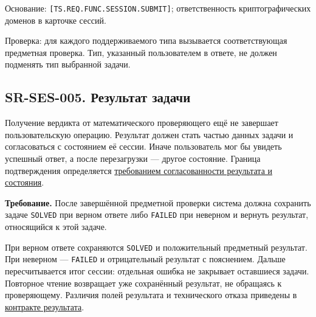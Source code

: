 \documentclass[12pt,a4paper]{article}
\begin{document}
Основание: \texttt{[TS.\allowbreak{}REQ.\allowbreak{}FUNC.\allowbreak{}SESSION.\allowbreak{}SUBMIT]}; ответственность криптографических доменов в карточке сессий.

Проверка: для каждого поддерживаемого типа вызывается соответствующая предметная проверка. Тип, указанный пользователем в ответе, не должен подменять тип выбранной задачи.

\subsection{SR-SES-005. Результат задачи}\label{sr-ses-005-ux440ux435ux437ux443ux43bux44cux442ux430ux442-ux437ux430ux434ux430ux447ux438}

\hypertarget{sr-ses-005-результат-задачи}{}

Получение вердикта от математического проверяющего ещё не завершает пользовательскую операцию. Результат должен стать частью данных задачи и согласоваться с состоянием её сессии. Иначе пользователь мог бы увидеть успешный ответ, а после перезагрузки --- другое состояние. Граница подтверждения определяется \hyperref[sr-sys-005-ux441ux43eux433ux43bux430ux441ux43eux432ux430ux43dux43dux43eux441ux442ux44c-ux440ux435ux437ux443ux43bux44cux442ux430ux442ux430-ux438-ux441ux43eux441ux442ux43eux44fux43dux438ux44f]{требованием согласованности результата и состояния}.

\textbf{Требование.} После завершённой предметной проверки система должна сохранить задаче \texttt{SOLVED} при верном ответе либо \texttt{FAILED} при неверном и вернуть результат, относящийся к этой задаче.

При верном ответе сохраняются \texttt{SOLVED} и положительный предметный результат. При неверном --- \texttt{FAILED} и отрицательный результат с пояснением. Дальше пересчитывается итог сессии: отдельная ошибка не закрывает оставшиеся задачи. Повторное чтение возвращает уже сохранённый результат, не обращаясь к проверяющему. Различия полей результата и технического отказа приведены в \href{../07_\%D0\%9F\%D1\%80\%D0\%BE\%D0\%B3\%D1\%80\%D0\%B0\%D0\%BC\%D0\%BC\%D0\%BD\%D1\%8B\%D0\%B5_\%D1\%82\%D1\%80\%D0\%B5\%D0\%B1\%D0\%BE\%D0\%B2\%D0\%B0\%D0\%BD\%D0\%B8\%D1\%8F/DOC-06.2_\%D0\%A1\%D0\%B5\%D1\%81\%D1\%81\%D0\%B8\%D0\%B8_\%D0\%B7\%D0\%B0\%D0\%B4\%D0\%B0\%D1\%87_\%D0\%B8_\%D0\%BF\%D0\%BB\%D0\%B0\%D0\%BD\%D0\%B8\%D1\%80\%D0\%BE\%D0\%B2\%D1\%89\%D0\%B8\%D0\%BA.pdf\#nameddest=\%D1\%80\%D0\%B5\%D0\%B7\%D1\%83\%D0\%BB\%D1\%8C\%D1\%82\%D0\%B0\%D1\%82-\%D0\%B8-\%D0\%BE\%D1\%82\%D0\%BA\%D0\%B0\%D0\%B7\%D1\%8B}{контракте результата}.
\end{document}
